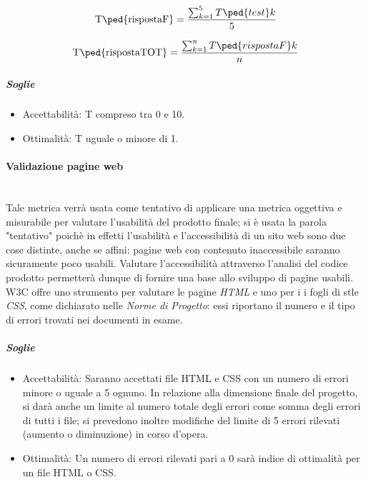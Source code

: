 	\begin{displaymath}
		\mbox{T\ped{rispostaF}} =\frac{\sum_{k=1}^5 T\ped{test}k}{5}
	\end{displaymath}
	
	\begin{displaymath}
		\mbox{T\ped{rispostaTOT}} =\frac{\sum_{k=1}^n T\ped{rispostaF}k}{n}
	\end{displaymath}
	
	\subparagraph{Soglie}
	\begin{itemize}
	\item Accettabilità: T compreso tra 0 e 10.
	\item Ottimalità: T uguale o minore di 1.
	\end{itemize}
	 
\paragraph{Validazione pagine web}
\label{AppB:Usabilita}
	~\\Tale metrica verrà usata come tentativo di applicare una metrica oggettiva e misurabile per valutare l'usabilità del prodotto finale; si è usata la parola "tentativo" poichè in effetti l'usabilità e l'accessibilità di un sito web sono due cose distinte, anche se affini: pagine web con contenuto inaccessibile saranno sicuramente poco usabili. Valutare l'accessibilità attraverso l'analisi del codice prodotto permetterà dunque di fornire una base allo sviluppo di pagine usabili.
W3C offre uno strumento per valutare le pagine \emph{HTML} e uno per i i fogli di stle \emph{CSS}, come dichiarato nelle \emph{Norme di Progetto}: essi riportano il numero e il tipo di errori trovati nei documenti in esame.

\subparagraph{Soglie}
	\begin{itemize}
	\item Accettabilità: Saranno accettati file HTML e CSS con un numero di errori minore o uguale a 5 ognuno. In relazione alla dimensione finale del progetto, si darà anche un limite al numero totale degli errori come somma degli errori di tutti i file; si prevedono inoltre modifiche del limite di 5 errori rilevati (aumento o diminuzione) in corso d'opera.
	\item Ottimalità: Un numero di errori rilevati pari a 0 sarà indice di ottimalità per un file HTML o CSS.
	\end{itemize}
	
\pagebreak
